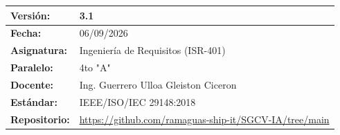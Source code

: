 \documentclass[
]{article}
\newcounter{none} %
\begin{document}
{\def\LTcaptype{none} %
\begin{longtable}[]{|
  >{\raggedright\arraybackslash}p{}|
  >{\raggedright\arraybackslash}p{}|}
\hline
\begin{minipage}[b]{\linewidth}\raggedright
\textbf{Versión:}
\end{minipage} & \begin{minipage}[b]{\linewidth}\raggedright
3.1
\end{minipage} \\
\hline
\endhead
\hline
\endlastfoot
\begin{minipage}[t]{\linewidth}\raggedright
\textbf{Fecha:}
\end{minipage} & \begin{minipage}[t]{\linewidth}\raggedright
06/09/2026
\end{minipage} \\
\hline
\begin{minipage}[t]{\linewidth}\raggedright
\textbf{Asignatura:}
\end{minipage} & \begin{minipage}[t]{\linewidth}\raggedright
Ingeniería de Requisitos (ISR-401)
\end{minipage} \\
\hline
\begin{minipage}[t]{\linewidth}\raggedright
\textbf{Paralelo:}
\end{minipage} & \begin{minipage}[t]{\linewidth}\raggedright
4to "A"
\end{minipage} \\
\hline
\begin{minipage}[t]{\linewidth}\raggedright
\textbf{Docente:}
\end{minipage} & \begin{minipage}[t]{\linewidth}\raggedright
Ing. Guerrero Ulloa Gleiston Ciceron
\end{minipage} \\
\hline
\begin{minipage}[t]{\linewidth}\raggedright
\textbf{Estándar:}
\end{minipage} & \begin{minipage}[t]{\linewidth}\raggedright
IEEE/ISO/IEC 29148:2018~\cite{iso29148}
\end{minipage} \\
\hline
\begin{minipage}[t]{\linewidth}\raggedright
\textbf{Repositorio:}
\end{minipage} & \begin{minipage}[t]{\linewidth}\raggedright
\url{https://github.com/ramaguas-ship-it/SGCV-IA/tree/main}
\end{minipage} \\
\hline
\end{longtable}
}
\end{document}

